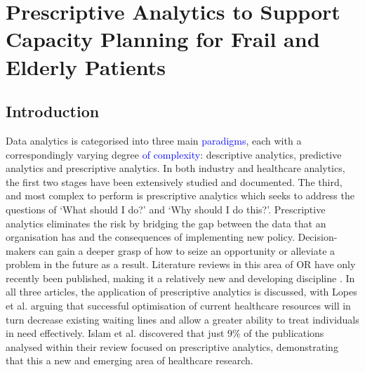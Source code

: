 \documentclass[../thesis.tex]{subfiles}
\begin{document}
\chapter{Prescriptive Analytics to Support Capacity Planning for Frail and Elderly Patients}\label{chp:presciptive}

\section{Introduction}

Data analytics is categorised into three main \textcolor{blue}{paradigms}, each with a correspondingly varying degree \textcolor{blue}{of complexity}: descriptive analytics, predictive analytics and prescriptive analytics. In both industry and healthcare analytics, the first two stages have been extensively studied and documented. The third, and most complex \textcolor{blue}{\cite{Hertog2016}} to perform is prescriptive analytics which seeks to address the questions of `What should I do?' and `Why should I do this?'. Prescriptive analytics eliminates the risk by bridging the gap between the data that an organisation has and the consequences of implementing new policy. Decision-makers can gain a deeper grasp of how to seize an opportunity or alleviate a problem in the future as a result. Literature reviews in this area of OR have only recently been published, making it a relatively new and developing discipline \cite{Islam2018,Lopes2020,Lepenioti2019}. In all three articles, the application of prescriptive analytics is discussed, with Lopes et al. \cite{Lopes2020} arguing that successful optimisation of current healthcare resources will in turn decrease existing waiting lines and allow a greater ability to treat individuals in need effectively. Islam et al. \cite{Islam2018} discovered that just 9\% of the publications analysed within their review focused on prescriptive analytics, demonstrating that this a new and emerging area of healthcare research.

\end{document}
